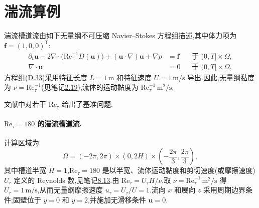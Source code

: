 \section{湍流算例}\label{sec:appendix-d-3}

\begin{example}[湍流槽道流]\label{ex:appendix-d-12}
湍流槽道流由如下无量纲不可压缩 Navier--Stokes 方程组描述,其中体力项为 $\bm f=(1,0,0)^\mathsf T$:
\begin{equation}\label{eq:appendix-d-33}
\begin{aligned}
\partial_t\bm u
-2\nabla\cdot\bigl(\mathrm{Re}_{\tau}^{-1}D(\bm u)\bigr)
+(\bm u\cdot\nabla)\bm u+\nabla p
&=\bm f
&&\text{于 }(0,T]\times\Omega,\\
\nabla\cdot\bm u&=0
&&\text{于 }(0,T]\times\Omega,
\end{aligned}
\end{equation}
方程组\hyperref[eq:appendix-d-33]{(D.33)}采用特征长度 $L=1\,\mathrm m$ 和特征速度 $U=1\,\mathrm{m/s}$ 导出.因此,无量纲黏度为 $\nu=\mathrm{Re}_{\tau}^{-1}$(见笔记\hyperref[note:characteristic-scales]{2.19}),流体的运动黏度为 $\mathrm{Re}_{\tau}^{-1}\,\mathrm{m^2/s}$.

文献中对若干 $\mathrm{Re}_\tau$ 给出了基准问题.

\paragraph{$\mathrm{Re}_\tau=180$ 的湍流槽道流.}
计算区域为
\[
\Omega=(-2\pi,2\pi)\times(0,2H)\times
\left(-\frac{2\pi}{3},\frac{2\pi}{3}\right),
\]
其中槽道半宽 $H=1$,$\mathrm{Re}_\tau=180$ 是以半宽、流体运动黏度和剪切速度(或摩擦速度)$U_\tau$ 定义的 Reynolds 数,见笔记\hyperref[note:turbulent-boundary-layers]{8.13}.由
$\mathrm{Re}_\tau=U_\tau H/\nu$,取 $\nu=\mathrm{Re}_\tau^{-1}\,\mathrm{m^2/s}$ 得
$U_\tau=1\,\mathrm{m/s}$,从而无量纲摩擦速度 $u_\tau=U_\tau/U=1$.流向 $x$ 和展向 $z$ 采用周期边界条件;固壁位于 $y=0$ 和 $y=2$,并施加无滑移条件 $\bm u=0$.


\end{example}
